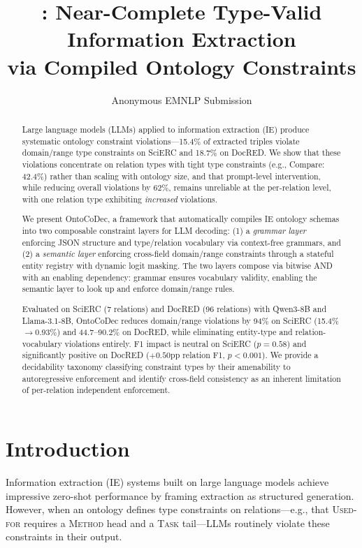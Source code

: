 \documentclass[11pt,a4paper]{article}
\title{\sys{}: Near-Complete Type-Valid Information Extraction\\via Compiled Ontology Constraints}
\author{
  Anonymous EMNLP Submission
}
\date{}
\newcommand{\sys}{OntoCoDec}
\begin{document}
\maketitle

\begin{abstract}
Large language models (LLMs) applied to information extraction (IE) produce systematic ontology constraint violations---15.4\% of extracted triples violate domain/range type constraints on SciERC and 18.7\% on DocRED. We show that these violations concentrate on relation types with tight type constraints (e.g., Compare: 42.4\%) rather than scaling with ontology size, and that prompt-level intervention, while reducing overall violations by 62\%, remains unreliable at the per-relation level, with one relation type exhibiting \emph{increased} violations.

We present \sys{}, a framework that automatically compiles IE ontology schemas into two composable constraint layers for LLM decoding: (1) a \emph{grammar layer} enforcing JSON structure and type/relation vocabulary via context-free grammars, and (2) a \emph{semantic layer} enforcing cross-field domain/range constraints through a stateful entity registry with dynamic logit masking. The two layers compose via bitwise AND with an enabling dependency: grammar ensures vocabulary validity, enabling the semantic layer to look up and enforce domain/range rules.

Evaluated on SciERC (7 relations) and DocRED (96 relations) with Qwen3-8B and Llama-3.1-8B, \sys{} reduces domain/range violations by 94\% on SciERC (15.4\%$\to$0.93\%) and 44.7--90.2\% on DocRED, while eliminating entity-type and relation-vocabulary violations entirely. F1 impact is neutral on SciERC ($p{=}0.58$) and significantly positive on DocRED ($+0.50$pp relation F1, $p{<}0.001$). We provide a decidability taxonomy classifying constraint types by their amenability to autoregressive enforcement and identify cross-field consistency as an inherent limitation of per-relation independent enforcement.
\end{abstract}

\section{Introduction}
\label{sec:intro}

Information extraction (IE) systems built on large language models achieve impressive zero-shot performance by framing extraction as structured generation. However, when an ontology defines type constraints on relations---e.g., that \textsc{Used-for} requires a \textsc{Method} head and a \textsc{Task} tail---LLMs routinely violate these constraints in their output.
\end{document}
